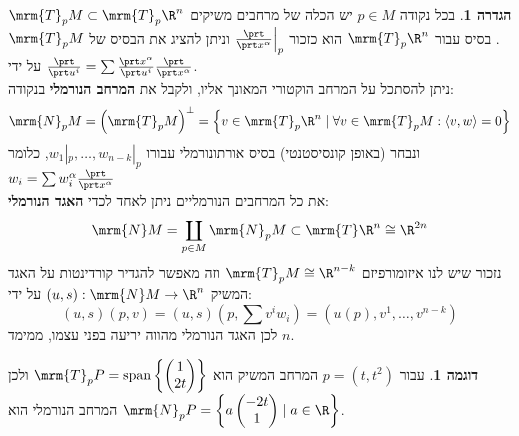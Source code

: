 \documentclass{article}
\theoremstyle{definition}
\newtheorem*{definition*}{הגדרה}
\newtheorem*{example*}{דוגמה}
\DeclareMathOperator{\spn}{span}
\begin{document}
	\begin{definition*}
		בכל נקודה
		$p\in M$
		יש הכלה של מרחבים משיקים
		\(\mrm{T}_p M \subset \mrm{T}_p \R^n\).
		בסיס עבור
		\(\mrm{T}_p \R^n\)
		הוא כזכור
		\(\frac{\prt}{\prt x^\alpha}\Big|_p\)
		וניתן להציג את הבסיס של
		\(\mrm{T}_p M\)
		על ידי
		\(\frac{\prt}{\prt u^i} = \sum \frac{\prt x^\alpha}{\prt u^i} \frac{\prt}{\prt x^\alpha}\).
		\\
		ניתן להסתכל על המרחב הוקטורי המאונך אליו, ולקבל את \textbf{המרחב הנורמלי} בנקודה:
		\[
			\mrm{N}_p M
			= \left(\mrm{T}_p M\right)^\bot
			= \left\{
				v \in \mrm{T}_p \R^n
				\mid
				\forall v \in \mrm{T}_p M: \langle v,w \rangle=0
			\right\}
		\]
		ונבחר (באופן קונסיסטנטי) בסיס אורתונורמלי עבורו
		\(w_1|_p,\dotsc,w_{n-k}|_p\),
		כלומר
		\(w_i=\sum w_i^\alpha \frac{\prt}{\prt x^\alpha}\)
		\\
		את כל המרחבים הנורמליים ניתן לאחד לכדי \textbf{האגד הנורמלי}:
		\[
			\mrm{N} M
			= \coprod_{p \in M} \mrm{N}_p M
			\subset \mrm{T} \R^n
			\cong \R^{2n}
		\]
		נזכור שיש לנו איזומורפיזם
		\(\mrm{T}_p M \cong \R^{n-k}\)
		וזה מאפשר להגדיר קורדינטות על האגד המשיק
		\((u,s): \mrm{N} M \to \R^n\)
		על ידי:
		\[
		(u,s)(p,v)
		= (u,s)(p,\sum v^i w_i)
		= (u(p),v^1,\dotsc,v^{n-k})
		\]
		לכן האגד הנורמלי מהווה יריעה בפני עצמו, ממימד \(n\).
	\end{definition*}

	\begin{example*}
		עבור
		\(p=(t,t^2)\)
		המרחב המשיק הוא
		\(
			\mrm{T}_p P
			= \spn\left\{
				\begin{pmatrix}
					1\\2t
				\end{pmatrix}
			\right\}
		\)
		ולכן המרחב הנורמלי הוא
		\(
			\mrm{N}_p P
			= \left\{
				a
				\begin{pmatrix}
					-2t\\1
				\end{pmatrix}
				\mid
				a \in \R
			\right\}
		\).
	\end{example*}
\end{document}
